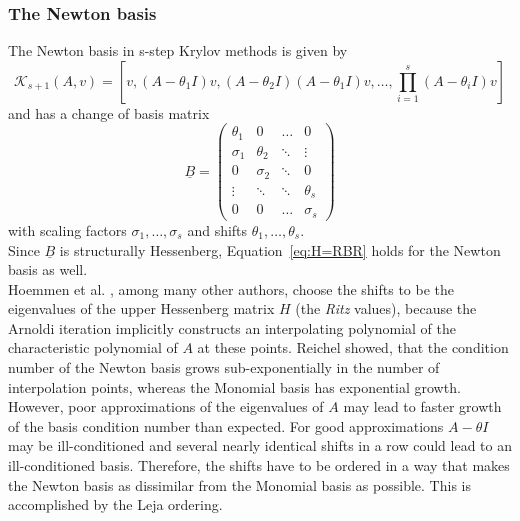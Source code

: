 \documentclass{scrartcl}
\numberwithin{equation}{section}
\begin{document}
\subsubsection{The Newton basis}
The Newton basis in s-step Krylov methods is given by 
\begin{equation*}
\mathcal{K}_{s + 1}(A, v) = \left[v, (A - \theta_1 I )v, (A - \theta_2 I )(A - \theta_1 I )v, \ldots, \displaystyle\prod_{i = 1}^s (A - \theta_i I )v\right]
\end{equation*}
and has a change of basis matrix
\begin{equation}
\underline{B} = 
\begin{pmatrix}
\theta_1 & 0 & \ldots & 0 \\
\sigma_1 & \theta_2 & \ddots & \vdots \\
0 & \sigma_2 & \ddots & 0 \\
\vdots & \ddots & \ddots & \theta_s \\
0 & 0 & \ldots & \sigma_s 
\end{pmatrix}
\end{equation}
with scaling factors $\sigma_1, \ldots, \sigma_s$ and shifts $\theta_1, \ldots, \theta_s$.\\

Since $\underline{B}$ is structurally Hessenberg, Equation~\eqref{eq:H=RBR} holds for the Newton basis as well.\\

Hoemmen et al. \cite{Hoemmen:2010:CKS:1970638}, among many other authors, choose the shifts to be the eigenvalues of the upper Hessenberg matrix $H$ (the \textit{Ritz} values), because the Arnoldi iteration implicitly constructs an interpolating polynomial of the characteristic polynomial of $A$ at these points. Reichel \cite{Reichel1990} showed, that the condition number of the Newton basis grows sub-exponentially in the number of interpolation points, whereas the Monomial basis has exponential growth. However, poor approximations of the eigenvalues of $A$ may lead to faster growth of the basis condition number than expected. For good approximations $A - \theta I$ may be ill-conditioned and several nearly identical shifts in a row could lead to an ill-conditioned basis. Therefore, the shifts have to be ordered in a way that makes the Newton basis as dissimilar from the Monomial basis as possible. This is accomplished by the Leja ordering.
\end{document}
